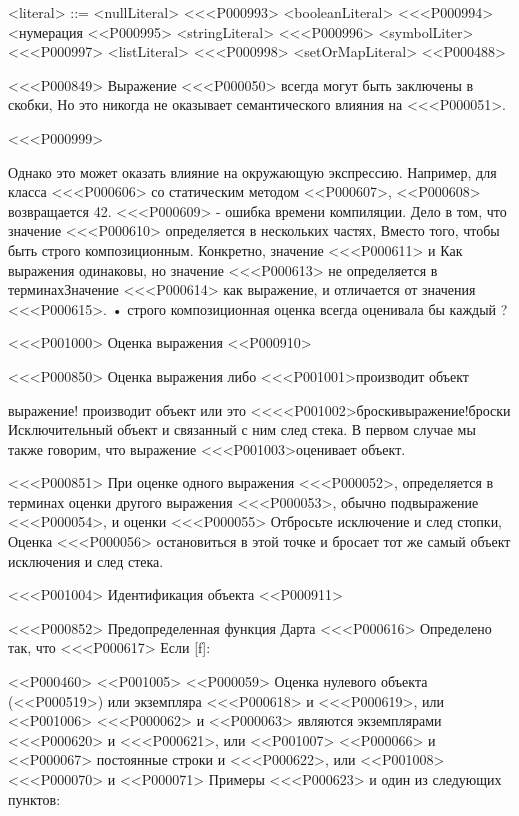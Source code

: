 {{{{{{{{{{{<literal> ::= <nullLiteral>
<<<P000993> <booleanLiteral>
<<<P000994> <нумерация
<<P000995> <stringLiteral>
<<<P000996> <symbolLiter>
<<<P000997> <listLiteral>
<<<P000998> <setOrMapLiteral>
<<P000488>

<<<P000849>%
Выражение <<<P000050> всегда могут быть заключены в скобки,
Но это никогда не оказывает семантического влияния на <<<P000051>.

<<<P000999>{%
Однако это может оказать влияние на окружающую экспрессию.
Например, для класса <<<P000606> со статическим методом
<<P000607>, <<P000608> возвращается 42.
<<<P000609> - ошибка времени компиляции.
%
Дело в том, что значение <<<P000610>
определяется в нескольких частях,
Вместо того, чтобы быть строго композиционным.
Конкретно, значение <<<P000611> и  Как выражения одинаковы,
но значение <<<P000613> не определяется в терминахЗначение <<<P000614> как выражение,
и отличается от значения <<<P000615>.%
• строго композиционная оценка всегда оценивала бы каждый
?


<<<P001000> Оценка выражения
<<P000910>

<<<P000850>%
Оценка выражения либо
<<<P001001>{производит объект}{выражение! производит объект
или это
<<<<P001002>{броски}{выражение!броски}
Исключительный объект и связанный с ним след стека.
В первом случае мы также говорим, что выражение
<<<P001003>{оценивает объект}.

<<<P000851>%
При оценке одного выражения <<<P000052>,
определяется в терминах оценки другого выражения <<<P000053>,
обычно подвыражение <<<P000054>,
и оценки <<<P000055> Отбросьте исключение и след стопки,
Оценка <<<P000056> остановиться в этой точке
и бросает тот же самый объект исключения и след стека.


<<<P001004> Идентификация объекта
<<P000911>

<<<P000852>%
Предопределенная функция Дарта <<<P000616>
Определено так, что <<<P000617> Если [f]:

<<P000460>
<<P001005> <<P000059> Оценка нулевого объекта (<<P000519>)
или экземпляра <<<P000618> и <<<P000619>, или
<<P001006> <<<P000062> и <<P000063> являются экземплярами <<<P000620> и <<<P000621>, или
<<P001007> <<P000066> и <<P000067> постоянные строки и <<<P000622>, или
<<P001008> <<<P000070> и <<P000071> Примеры <<<P000623>
и один из следующих пунктов:

}}}}}}}}}}}}}
